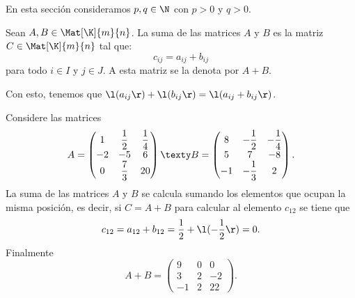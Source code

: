 \documentclass[compacto,10pt]{pubciencias-notas}
\begin{document}
En esta sección consideramos  $p,q\in \N$ con $p>0$ y $q>0$.

\begin{defi}
    Sean $A, B \in \Mat[\K]{m}{n}$. La suma de las matrices $A$ y $B$ es la matriz $C\in \Mat[\K]{m}{n}$ tal que:
    \[ 
        c_{ij} = a_{ij} + b_{ij}
    \]
    para todo $i \in I$ y $j \in J$. A esta matriz se la denota por $A+B$.
\end{defi}

\begin{advertencia}
    Con esto, tenemos que $\l(a_{ij}\r)+\l(b_{ij}\r)=\l(a_{ij} + b_{ij}\r)$.
\end{advertencia}

\begin{ejem}\label{Ejem:Sem01Clas01SumaMat}
Considere las matrices
\[ 
    A = 
    \begin{pmatrix}
    1&\dfrac{1}{2}&\dfrac{1}{4}\\
    -2&-5&6\\
    0&\dfrac{7}{3}&20
    \end{pmatrix}
    \texty
    B = 
    \begin{pmatrix}
    8&-\dfrac{1}{2}&-\dfrac{1}{4}\\
    5&7&-8\\
    -1&-\dfrac{1}{3}& 2
    \end{pmatrix}.
\]
La suma de las matrices $A$ y $B$ se calcula sumando los elementos que ocupan la misma posición, es decir, si $C = A + B$ para calcular al elemento $c_{12}$ se tiene que
\[
    c_{12} = a_{12} + b_{12} = \dfrac{1}{2} + \l(- \dfrac{1}{2}\r) = 0.
\]
Finalmente
\[
A+B = 
\begin{pmatrix}
9 & 0 &0 \\
3 & 2 & -2 \\
-1 &2 & 22
\end{pmatrix}.
\]
\end{ejem}
\end{document}
